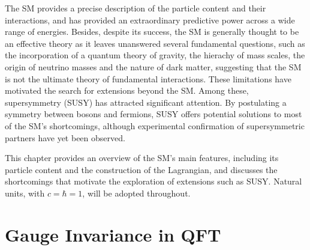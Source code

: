 The SM provides a precise description of the particle content and their interactions, and has provided an extraordinary predictive power across a wide range of energies. Besides, despite its success, the SM is generally thought to be an effective theory as it leaves unanswered several fundamental questions, such as the incorporation of a quantum theory of gravity, the hierachy of mass scales, the origin of neutrino masses and the nature of dark matter, suggesting that the SM is not the ultimate theory of fundamental interactions. These limitations have motivated the search for extensions beyond the SM. Among these, supersymmetry (SUSY) has attracted significant attention. By postulating a symmetry between bosons and fermions, SUSY offers potential solutions to most of the SM's shortcomings, although experimental confirmation of supersymmetric partners have yet been observed.

This chapter provides an overview of the SM's main features, including its particle content and the construction of the Lagrangian, and discusses the shortcomings that motivate the exploration of extensions such as SUSY. Natural units, with $c=\hbar=1$, will be adopted throughout.
 
\section{Gauge Invariance in QFT}
\label{gauge_inv}

